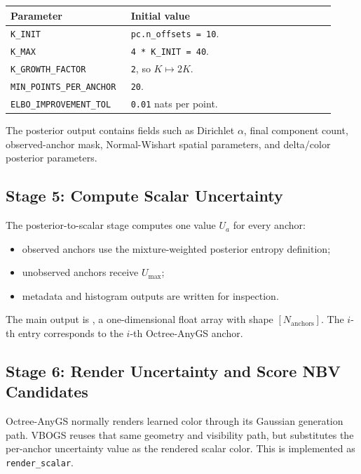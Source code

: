 \documentclass[11pt]{article}
\newcommand{\Umax}{U_{\max}}
\begin{document}
\begin{longtable}{@{}p{0.32\linewidth}p{0.60\linewidth}@{}}
\toprule
\textbf{Parameter} & \textbf{Initial value} \\
\midrule
\endhead
\texttt{K\_INIT} & \texttt{pc.n\_offsets = 10}. \\
\texttt{K\_MAX} & \texttt{4 * K\_INIT = 40}. \\
\texttt{K\_GROWTH\_FACTOR} & \texttt{2}, so \(K \mapsto 2K\). \\
\texttt{MIN\_POINTS\_PER\_ANCHOR} & \texttt{20}. \\
\texttt{ELBO\_IMPROVEMENT\_TOL} & \texttt{0.01} nats per point. \\
\bottomrule
\end{longtable}

The posterior output contains fields such as Dirichlet \(\alpha\), final
component count, observed-anchor mask, Normal-Wishart spatial parameters, and
delta/color posterior parameters.

\subsection{Stage 5: Compute Scalar Uncertainty}

The posterior-to-scalar stage computes one value \(U_a\) for every anchor:

\begin{itemize}
  \item observed anchors use the mixture-weighted posterior entropy definition;
  \item unobserved anchors receive \(\Umax\);
  \item metadata and histogram outputs are written for inspection.
\end{itemize}

The main output is , a one-dimensional float array with shape
\([N_{\mathrm{anchors}}]\). The \(i\)-th entry corresponds to the \(i\)-th
Octree-AnyGS anchor.

\subsection{Stage 6: Render Uncertainty and Score NBV Candidates}

Octree-AnyGS normally renders learned color through its Gaussian generation
path. VBOGS reuses that same geometry and visibility path, but substitutes the
per-anchor uncertainty value as the rendered scalar color. This is implemented
as \texttt{render\_scalar}.
\end{document}

